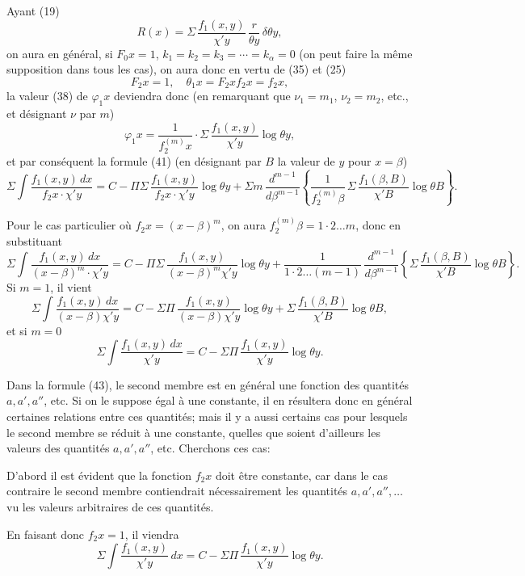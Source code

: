 \documentclass{article}
\begin{document}
Ayant (19)
\[ R(x) = \Sigma\,\frac{f_1(x, y)}{\chi' y}\,\frac{r}{\theta y}\,\delta\theta y, \]
on aura en général, si $F_0 x = 1$, $k_1 = k_2 = k_3 = \cdots = k_\alpha = 0$ (on peut faire la même supposition dans tous les cas), on aura donc en vertu de (35) et (25)
\[ F_2 x = 1, \quad \theta_1 x = F_2 x f_2 x = f_2 x, \]
la valeur (38) de $\varphi_1 x$ deviendra donc (en remarquant que $\nu_1 = m_1$, $\nu_2 = m_2$, etc., et désignant $\nu$ par $m$)
\[ \varphi_1 x = \frac{1}{f_2^{(m)} x} \cdot \Sigma\,\frac{f_1(x, y)}{\chi' y}\log\theta y, \]
et par conséquent la formule (41) (en désignant par $B$ la valeur de $y$ pour $x = \beta$)
\[ \Sigma\int \frac{f_1(x, y)\,dx}{f_2 x \cdot \chi' y} = C - \Pi\Sigma\,\frac{f_1(x, y)}{f_2 x \cdot \chi' y}\log\theta y + \Sigma m\,\frac{d^{m-1}}{d\beta^{m-1}} \left\{ \frac{1}{f_2^{(m)}\beta}\,\Sigma\,\frac{f_1(\beta, B)}{\chi' B}\log\theta B \right\}. \tag{43} \]

Pour le cas particulier où $f_2 x = (x-\beta)^m$, on aura $f_2^{(m)}\beta = 1 \cdot 2 \ldots m$, donc en substituant
\[ \Sigma\int \frac{f_1(x, y)\,dx}{(x-\beta)^m \cdot \chi' y} = C - \Pi\Sigma\,\frac{f_1(x, y)}{(x-\beta)^m \chi' y}\log\theta y + \frac{1}{1 \cdot 2 \ldots (m-1)}\,\frac{d^{m-1}}{d\beta^{m-1}} \left\{ \Sigma\,\frac{f_1(\beta, B)}{\chi' B}\log\theta B \right\}. \tag{44} \]
Si $m = 1$, il vient
\[ \Sigma\int \frac{f_1(x, y)\,dx}{(x-\beta)\chi' y} = C - \Sigma\Pi\,\frac{f_1(x, y)}{(x-\beta)\chi' y}\log\theta y + \Sigma\,\frac{f_1(\beta, B)}{\chi' B}\log\theta B, \tag{45} \]
et si $m = 0$
\[ \Sigma\int \frac{f_1(x, y)\,dx}{\chi' y} = C - \Sigma\Pi\,\frac{f_1(x, y)}{\chi' y}\log\theta y. \tag{46} \]

Dans la formule (43), le second membre est en général une fonction des quantités $a, a', a''$, etc. Si on le suppose égal à une constante, il en résultera donc en général certaines relations entre ces quantités; mais il y a aussi certains cas pour lesquels le second membre se réduit à une constante, quelles que soient d'ailleurs les valeurs des quantités $a, a', a''$, etc. Cherchons ces cas:

D'abord il est évident que la fonction $f_2 x$ doit être constante, car dans le cas contraire le second membre contiendrait nécessairement les quantités $a, a', a'', \ldots$ vu les valeurs arbitraires de ces quantités.

En faisant donc $f_2 x = 1$, il viendra
\[ \Sigma\int \frac{f_1(x, y)}{\chi' y}\,dx = C - \Sigma\Pi\,\frac{f_1(x, y)}{\chi' y}\log\theta y. \]
\end{document}
